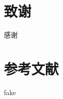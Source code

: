 \documentclass[master, macfonts]{njuthesis}
\author{李达}
\institute{南京大学}
\date{2021年x月xx日}
\begin{document}

\maketitle
\makeenglishtitle


\frontmatter





\tableofcontents

\listoffigures

\listoftables

\mainmatter








%

\chapter*{致谢}\label{acknowledgement}
感谢
\chapter*{参考文献}\label{references}
fake
\nocite{*}

%
%
\end{document}

